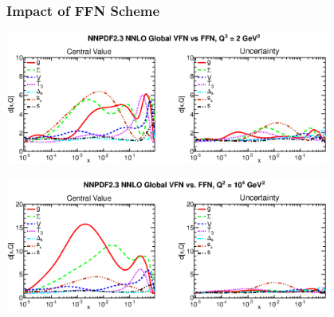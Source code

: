 \documentclass[10pt]{beamer}
\begin{document}
\begin{frame}
\frametitle{Impact of FFN Scheme}
\begin{center} \includegraphics[width=0.8\textwidth]{distances-nnpdf23-global-vfn-vs-ffn-q2-2gev2.eps} \end{center}
\begin{center}   \includegraphics[width=0.8\textwidth]{distances-nnpdf23-global-vfn-vs-ffn-q2-10000gev2.eps} \end{center}
\vskip10pt
\end{frame}
\end{document}
